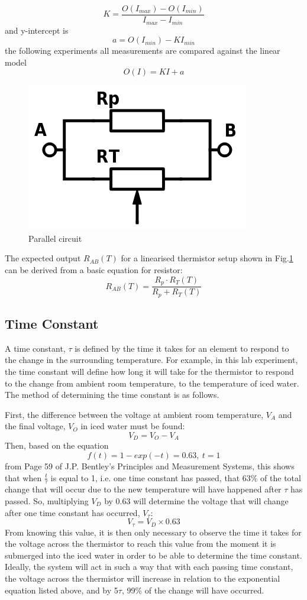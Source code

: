\documentclass[a4,11pt]{article}
\begin{document}
$$K=\frac{O(I_{max})-O(I_{min})}{I_{max}-I_{min}}$$
and y-intercept is
\begin{equation}
  \label{eq:intercept}
  a=O(I_{min})-KI_{min}
\end{equation}
the following experiments all measurements are compared against the linear model
\begin{equation}
  O(I)=KI+a
\end{equation}
\begin{figure}[H]
  \label{fig:parallel}
  \centering
  \includegraphics[width=0.75\columnwidth]{parallel.png}
  \caption{
    Parallel circuit
  }
\end{figure}
The expected output $R_{AB}(T)$ for a linearised thermistor setup shown in Fig.\ref{fig:parallel} can be derived from a basic equation for resistor:
\begin{equation}
  \label{eq:Rab}
  R_{AB}(T)=\frac{R_p\cdot R_T(T)}{R_p+R_T(T)}
\end{equation}
\subsection{Time Constant} \label{sub:time}
A time constant, $\tau$ is defined by the time it takes for an element to respond to the change in the surrounding temperature. For example, in this lab experiment, the time constant will define how long it will take for the thermistor to respond to the change from ambient room temperature, to the temperature of iced water. The method of determining the time constant is as follows.

First, the difference between the voltage at ambient room temperature, $V_A$ and the final voltage, $V_O$ in iced water must be found:
$$V_D=V_O-V_A$$
Then, based on the equation
$$f(t)=1-exp(-t)=0.63,\ t=1$$
from Page 59 of J.P. Bentley's Principles and Measurement Systems, this shows that when $\frac{t}{\tau}$ is equal to 1, i.e. one time constant has passed, that 63\% of the total change that will occur due to the new temperature will have happened after $\tau$ has passed. So, multiplying $V_D$ by 0.63 will determine the voltage that will change after one time constant has occurred, $V_\tau$:
$$V_\tau=V_D\times0.63$$
From knowing this value, it is then only necessary to observe the time it takes for the voltage across the thermistor to reach this value from the moment it is submerged into the iced water in order to be able to determine the time constant. Ideally, the system will act in such a way that with each passing time constant, the voltage across the thermistor will increase in relation to the exponential equation listed above, and by 5$\tau$, 99\% of the change will have occurred.
\end{document}
